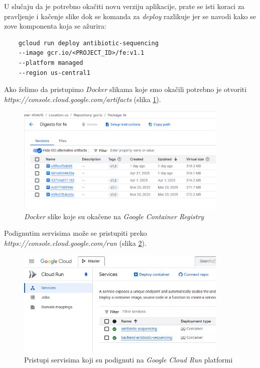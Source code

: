\documentclass[12pt,oneside]{memoir}
\begin{document}
U slučaju da je potrebno okačiti novu verziju aplikacije, prate se isti koraci za pravljenje i kačenje slike dok se komanda za \emph{deploy} razlikuje jer se navodi kako se zove komponenta koja se ažurira:
\begin{verbatim}
    gcloud run deploy antibiotic-sequencing 
    --image gcr.io/<PROJECT_ID>/fe:v1.1 
    --platform managed 
    --region us-central1
\end{verbatim}

Ako želimo da pristupimo \emph{Docker} slikama koje smo okačili potrebno je otvoriti \emph{https://console.cloud.google.com/artifacts} (slika \ref{fig:gcr_images}).
\begin{figure}[h]
\centering
\includegraphics[width=0.9\textwidth]{images/gcr_images.png}
\caption{\emph{Docker} slike koje su okačene na \emph{Google Container Registry}}
\label{fig:gcr_images}
\end{figure}

Podignutim servisima može se pristupiti preko \emph{https://console.cloud.google.com/run} (slika \ref{fig:gcr_services}).

\begin{figure}[h]
\centering
\includegraphics[width=0.9\textwidth]{images/gcr_services.png}
\caption{Pristupi servisima koji su podignuti na \emph{Google Cloud Run} platformi}
\label{fig:gcr_services}
\end{figure}
\end{document}
